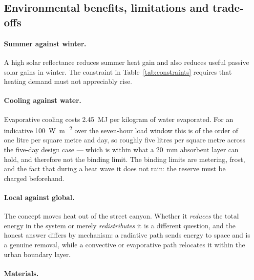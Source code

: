 \subsection{Environmental benefits, limitations and trade-offs}

\paragraph{Summer against winter.} A high solar reflectance reduces summer heat
gain and also reduces useful passive solar gains in winter. The constraint in
Table~\ref{tab:constraints} requires that heating demand must not appreciably
rise. 

\paragraph{Cooling against water.} Evaporative cooling costs
\qty{2.45}{\mega\joule} per kilogram of water evaporated. For an indicative
\qty{100}{\watt\per\square\metre} over the seven-hour load window this is of the
order of one litre per square metre and day, so roughly five litres per square
metre across the five-day design case --- which is within what a
\qty{20}{\milli\metre} absorbent layer can hold, and therefore not the binding
limit.  The binding limits are metering, frost, and the fact that during a heat
wave it does not rain: the reserve must be charged beforehand.

\paragraph{Local against global.} The concept moves heat out of the street
canyon. Whether it \emph{reduces} the total energy in the system or merely
\emph{redistributes} it is a different question, and the honest answer differs
by mechanism: a radiative path sends energy to space and is a genuine removal,
while a convective or evaporative path relocates it within the urban boundary
layer. 

\paragraph{Materials.} 

